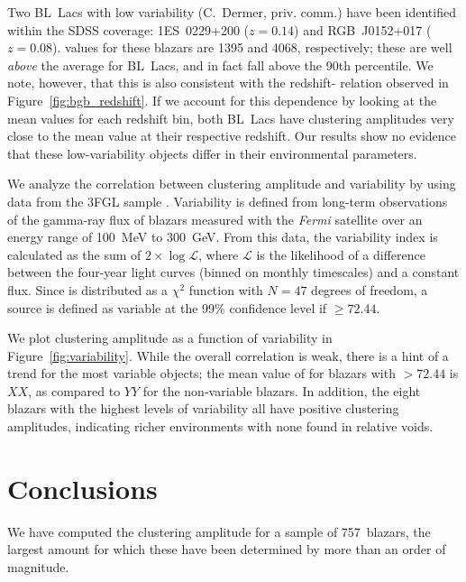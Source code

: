 \documentclass{emulateapj}
\begin{document}
Two BL~Lacs with low variability (C.~Dermer, priv. comm.) have been identified within the SDSS coverage: 1ES~0229+200 ($z=0.14$) and RGB~J0152+017 ($z=0.08$). \bgb{} values for these blazars are 1395 and 4068, respectively; these are well {\it above} the average \bgb{} for BL~Lacs, and in fact fall above the 90th percentile. We note, however, that this is also consistent with the redshift-\bgb{} relation observed in Figure~\ref{fig:bgb_redshift}. If we account for this dependence by looking at the mean \bgb{} values for each redshift bin, both BL~Lacs have clustering amplitudes very close to the mean value at their respective redshift. Our results show no evidence that these low-variability objects differ in their environmental parameters.  

We analyze the correlation between clustering amplitude and variability by using data from the 3FGL sample \citep{ack15}. Variability is defined from long-term observations of the gamma-ray flux of blazars measured with the {\it Fermi} satellite over an energy range of 100~MeV to 300~GeV. From this data, the variability index \tsvar{} is calculated as the sum of $2\times\log{\mathcal{L}}$, where $\mathcal{L}$ is the likelihood of a difference between the four-year light curves (binned on monthly timescales) and a constant flux. Since \tsvar{} is distributed as a $\chi^2$ function with $N=47$ degrees of freedom, a source is defined as variable at the 99\% confidence level if \tsvar{}$\geq72.44$.

We plot clustering amplitude as a function of variability in Figure~\ref{fig:variability}. While the overall correlation is weak, there is a hint of a trend for the most variable objects; the mean value of \bgb{} for blazars with \tsvar$>72.44$ is {\note $XX$}, as compared to {\note $YY$} for the non-variable blazars. In addition, the eight blazars with the highest levels of variability all have positive clustering amplitudes, indicating richer environments with none found in relative voids. 


\section{Conclusions}\label{sec_conclusions}

We have computed the clustering amplitude for a sample of 757~blazars, the largest amount for which these have been determined by more than an order of magnitude. 
\end{document}
